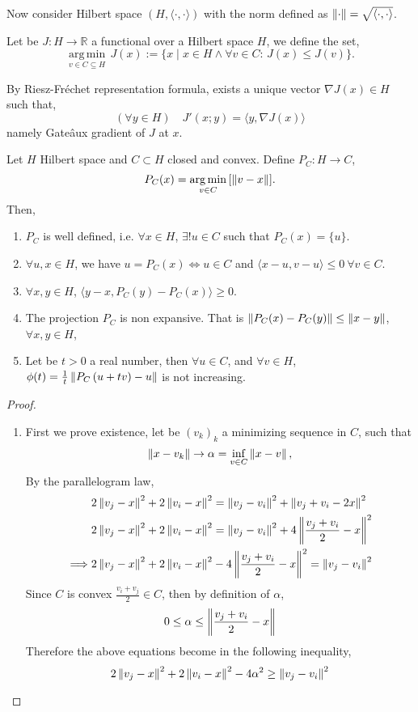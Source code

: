 Now consider Hilbert space $(H, \langle \cdot,\cdot \rangle)$ with the norm defined as $\left\lVert\cdot\right\rVert=\sqrt{\langle\cdot,\cdot\rangle}$.

Let be $J: H\rightarrow \mathbb{R}$ a functional over a Hilbert space $H$, we define the set,
\[
{\displaystyle {\underset {v\in C\subseteq H}{\operatorname {arg\,min} }}\,J(x):=\{x\mid x\in H \wedge \forall v\in C:\,J(x)\leq J(v)\}.}\]


By Riesz-Fr\'echet representation formula, exists a unique vector $\nabla J(x) \in H$ such that, 
\[
(\forall y \in H) \quad J'(x; y)=\langle y, \nabla J(x)\rangle
\]
namely Gate\^aux gradient of $J$ at $x$. 

\begin{lemma}
\label{lemma3. Projection}
Let $H$ Hilbert space and $C\subset H$ closed and convex. Define $P_C: H\rightarrow C$, \[P_C(x)={\displaystyle {\underset {v\in C}{\operatorname {arg\,min} }}\left[\left\lVert v-x\right\rVert\right]}.\]
Then,
\begin{enumerate}
	\item $P_C$ is well defined, i.e.  $\forall x \in H $, $\exists !u \in C$ such that $P_C(x)=\{u\}$.
	\item $\forall u,x\in H$, we have $u=P_C(x) \iff u\in C$  and  $\langle x-u, v-u\rangle\leq 0\ \forall v \in C$.
	\item $\forall x,y \in H$, $\langle y-x, P_C(y)-P_C(x)\rangle \geq 0$.
	\item The projection $P_C$ is non expansive. That is $\left\lVert P_C(x)-P_C(y)\right\rVert\leq \left\lVert x-y\right\rVert$, $\forall x,y\in H$, 
	\item Let be $t>0$ a real number, then $\forall u \in C$, and $\forall v\in H$, $\phi(t)=\frac{1}{t}\left\lVert P_C\left(u+tv\right)-u\right\rVert$ is not increasing.
\end{enumerate}
\begin{proof}\
	\begin{enumerate}
		\item First we prove existence, let be $(v_k)_k$ a minimizing sequence in $C$, such that
		\[
			\left\lVert x-v_k\right\rVert\rightarrow \alpha=\inf_{v \in C}\left\lVert x-v\right\rVert,
		\]
		By the parallelogram law,
		\begin{align*}
			&2\left\lVert v_j-x\right\rVert^2+2\left\lVert v_i-x\right\rVert^2= \left\lVert v_j-v_i\right\rVert^2+\left\lVert v_j+v_i-2x\right\rVert^2 \\
			&2\left\lVert v_j-x\right\rVert^2+2\left\lVert v_i-x\right\rVert^2= \left\lVert v_j-v_i\right\rVert^2+4\left\lVert\frac{v_j+v_i}{2}-x\right\rVert^2\\
	\implies&2\left\lVert v_j-x\right\rVert^2+2\left\lVert v_i-x\right\rVert^2-4\left\lVert\frac{v_j+v_i}{2}-x\right\rVert^2=\left\lVert v_j-v_i\right\rVert^2
		\end{align*}
		Since $C$ is convex $\frac{v_i+v_j}{2} \in C$, then by definition of $\alpha$,
		\[
		0\leq \alpha \leq \left\lVert\frac{v_j+v_i}{2}-x\right\rVert
		\]  
		Therefore the above equations become in the following inequality,
		\[
		2\left\lVert v_j-x\right\rVert^2+2\left\lVert v_i-x\right\rVert^2-4\alpha^2\geq \left\lVert v_j-v_i\right\rVert^2
		\]
		

\end{enumerate}
\end{proof}
\end{lemma}
